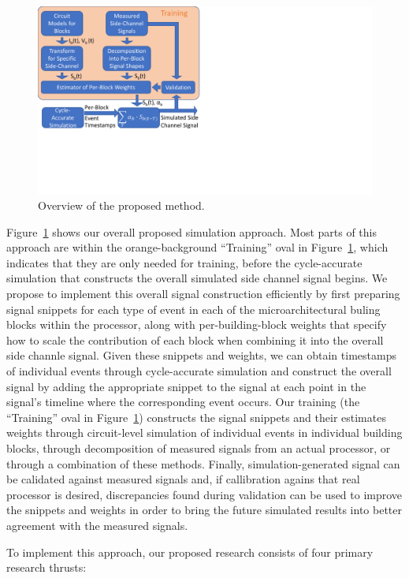 \begin{figure}
	\centering
	\includegraphics[width=0.4\columnwidth,trim={0in 2.65in 6.89in 0in},clip]{figure/overview.pdf}
	\caption{Overview of the proposed method.}
	\label{fig:overview}
\end{figure}

Figure~\ref{fig:overview} shows our overall proposed simulation approach. Most parts of this approach are within the orange-background ``Training'' oval in Figure~\ref{fig:overview}, which indicates that they are only needed for training, before the cycle-accurate simulation that constructs the overall simulated side channel signal begins. We propose to implement this overall signal construction efficiently by first preparing signal snippets for each type of event in each of the microarchitectural buling blocks within the processor, along with per-building-block weights that specify how to scale the contribution of each block when combining it into the overall side channle signal. Given these snippets and weights, we can obtain timestamps of individual events through cycle-accurate simulation and construct the overall signal by adding the appropriate snippet to the signal at each point in the signal's timeline where the corresponding event occurs. Our training (the ``Training'' oval in Figure~\ref{fig:overview}) constructs the signal snippets and their estimates weights through circuit-level simulation of individual events in individual building blocks, through decomposition of measured signals from an actual processor, or through a combination of these methods. Finally, simulation-generated signal can be calidated against measured signals and, if callibration agains that real processor is desired, discrepancies found during validation can be used to improve the snippets and weights in order to bring the future simulated results into better agreement with the measured signals.

To implement this approach, our proposed research consists of four primary research thrusts:

